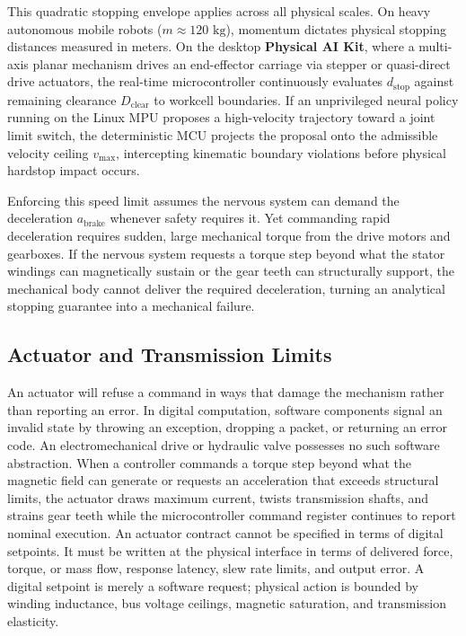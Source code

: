 \documentclass[
  letterpaper,
  DIV=11,
  numbers=noendperiod]{scrartcl}
\begin{document}
This quadratic stopping envelope applies across all physical scales. On
heavy autonomous mobile robots (\(m \approx 120\text{ kg}\)), momentum
dictates physical stopping distances measured in meters. On the desktop
\textbf{Physical AI Kit}, where a multi-axis planar mechanism drives an
end-effector carriage via stepper or quasi-direct drive actuators, the
real-time microcontroller continuously evaluates \(d_{\text{stop}}\)
against remaining clearance \(D_{\text{clear}}\) to workcell boundaries.
If an unprivileged neural policy running on the Linux MPU proposes a
high-velocity trajectory toward a joint limit switch, the deterministic
MCU projects the proposal onto the admissible velocity ceiling
\(v_{\text{max}}\), intercepting kinematic boundary violations before
physical hardstop impact occurs.

Enforcing this speed limit assumes the nervous system can demand the
deceleration \(a_{\text{brake}}\) whenever safety requires it. Yet
commanding rapid deceleration requires sudden, large mechanical torque
from the drive motors and gearboxes. If the nervous system requests a
torque step beyond what the stator windings can magnetically sustain or
the gear teeth can structurally support, the mechanical body cannot
deliver the required deceleration, turning an analytical stopping
guarantee into a mechanical failure.

\subsection{Actuator and Transmission Limits}\label{sec-body-2-4}

An actuator will refuse a command in ways that damage the mechanism
rather than reporting an error. In digital computation, software
components signal an invalid state by throwing an exception, dropping a
packet, or returning an error code. An electromechanical drive or
hydraulic valve possesses no such software abstraction. When a
controller commands a torque step beyond what the magnetic field can
generate or requests an acceleration that exceeds structural limits, the
actuator draws maximum current, twists transmission shafts, and strains
gear teeth while the microcontroller command register continues to
report nominal execution. An actuator contract cannot be specified in
terms of digital setpoints. It must be written at the physical interface
in terms of delivered force, torque, or mass flow, response latency,
slew rate limits, and output error. A digital setpoint is merely a
software request; physical action is bounded by winding inductance, bus
voltage ceilings, magnetic saturation, and transmission elasticity.
\end{document}
